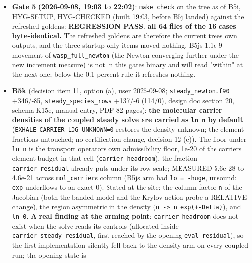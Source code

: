 \documentclass[english,a4paper]{my_memo}
\begin{document}
\begin{itemize}
  the matrix path (marching then Newton) with the B5j binary against the
  refreshed golden: movement 5.9e-9 (\texttt{Hydro\_ioniz.txt}) and 9.6e-9
  (\texttt{Ion\_species.txt}), 13 outer iterations to \texttt{\textbar{}\textbar{}R\textbar{}\textbar{}\ =\ 4.3e-9}, CERTIFIED,
  log10 Mdot 13.30; below the 0.1 percent rule, golden untouched.
\item
  \textbf{Gate 5 (2026-09-08, 19:03 to 22:02)}: \texttt{make\ check} on the tree as of
  B5i, HYG-SETUP, HYG-CHECKED (built 19:03, before B5j landed) against the
  refreshed goldens: \textbf{REGRESSION PASS, all 64 files of the 16 cases
  byte-identical.} The refreshed goldens are therefore the current tree\textquotesingle s
  own outputs, and the three startup-only items moved nothing. B5j\textquotesingle s
  1.1e-9 movement of \texttt{wasp\_full\_newton} (the Newton converging further
  under the new increment measure) is not in this gate\textquotesingle s binary and will
  read "within" at the next one; below the 0.1 percent rule it refreshes
  nothing.
\item
  \textbf{B5k} (decision item 11, option (a), user 2026-09-08; \texttt{steady\_newton.f90}
  +346/-85, \texttt{steady\_species\_rows} +137/-6 (114/0), design doc section 20,
  schema K15e, manual entry, PDF 82 pages): \textbf{the molecular carrier
  densities of the coupled steady solve are carried as \texttt{ln\ n} by default}
  (\texttt{EXHALE\_CARRIER\_LOG\_UNKNOWN=0} restores the density unknown; the element
  fractions untouched; no certification change, decision 12 (c)). The
  floor under \texttt{ln\ n} is the transport operator\textquotesingle s own admissibility floor,
  1e-20 of the carrier\textquotesingle s element budget in that cell (\texttt{carrier\_headroom}),
  the fraction \texttt{carrier\_residual} already puts under its row scale;
  MEASURED 5.6e-28 to 4.6e-21 across \texttt{mol\_carrier}\textquotesingle s column (B5j\textquotesingle s arm had
  \texttt{lo\ =\ -huge}, unsound: \texttt{exp} underflows to an exact 0). Stated at the
  site: the column factor \texttt{n} of the Jacobian (both the banded model and
  the Krylov action probe a RELATIVE change), the region asymmetric in the
  density (\texttt{n\ -\textgreater{}\ n\ exp(+-Delta)}), and \texttt{ln\ 0}. \textbf{A real finding at the
  arming point}: \texttt{carrier\_headroom} does not exist when the solve reads
  its controls (allocated inside \texttt{carrier\_steady\_residual}, first reached
  by the opening \texttt{eval\_residual}), so the first implementation silently
  fell back to the density arm on every coupled run; the opening state is

\end{itemize}
\end{document}
